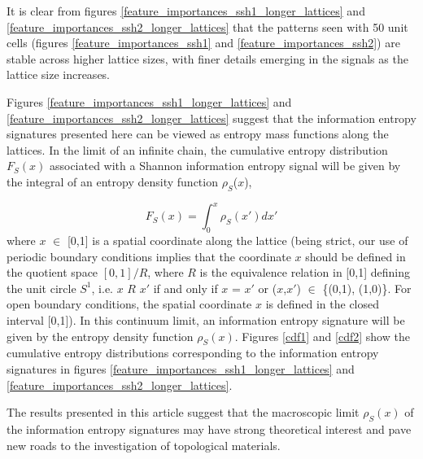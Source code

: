 \documentclass[10pt]{revtex4-1}
\begin{document}
It is clear from figures \ref{feature_importances_ssh1_longer_lattices} and \ref{feature_importances_ssh2_longer_lattices} that the patterns seen with 50 unit cells (figures \ref{feature_importances_ssh1} and \ref{feature_importances_ssh2}) are stable across higher lattice sizes, with finer details emerging in the signals as the lattice size increases.

Figures \ref{feature_importances_ssh1_longer_lattices} and \ref{feature_importances_ssh2_longer_lattices} suggest that the information entropy signatures presented here can be viewed as entropy mass functions along the lattices. In the limit of an infinite chain, the cumulative entropy distribution $F_S(x)$ associated with a Shannon information entropy signal will be given by the integral of an entropy density function $\rho_S$($x$),

\begin{equation}
\label{entropy_dens}
F_S(x) = \int_{0}^x\rho_S(x')dx'
\end{equation}
where $x$ $\in$ [0,1] is a spatial coordinate along the lattice (being strict, our use of periodic boundary conditions implies that the coordinate $x$ should be defined in the quotient space $[0,1]/R$, where $R$ is the equivalence relation in [0,1] defining the unit circle $S^1$, i.e. $x$ $R$ $x'$ if and only if $x$ = $x'$ or ($x$,$x'$) $\in$ \{(0,1), (1,0)\}. For open boundary conditions, the spatial coordinate $x$ is defined in the closed interval [0,1]). In this continuum limit, an information entropy signature will be given by the entropy density function $\rho_S(x)$. Figures \ref{cdf1} and \ref{cdf2} show the cumulative entropy distributions corresponding to the information entropy signatures in figures \ref{feature_importances_ssh1_longer_lattices} and \ref{feature_importances_ssh2_longer_lattices}.

The results presented in this article suggest that the macroscopic limit $\rho_S(x)$ of the information entropy signatures may have strong theoretical interest and pave new roads to the investigation of topological materials.
\end{document}
